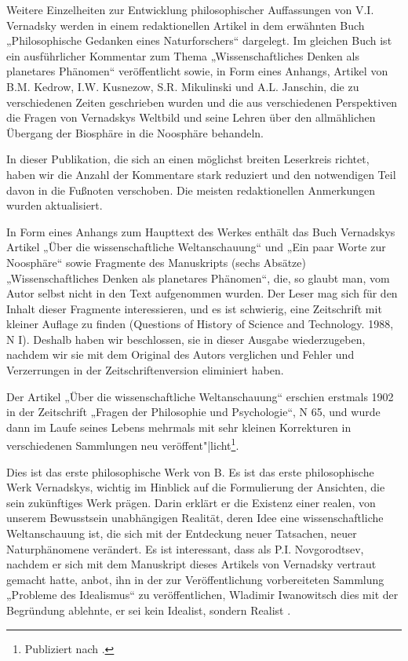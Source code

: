 \documentclass[11pt,a4paper]{article}
\begin{document}
Weitere Einzelheiten zur Entwicklung philosophischer Auffassungen von
V.I. Vernadsky werden in einem redaktionellen Artikel in dem erwähnten Buch
„Philosophische Gedanken eines Naturforschers“ dargelegt. Im gleichen Buch ist
ein ausführlicher Kommentar zum Thema „Wissenschaftliches Denken als
planetares Phänomen“ veröffentlicht sowie, in Form eines Anhangs, Artikel von
B.M. Kedrow, I.W. Kusnezow, S.R. Mikulinski und A.L. Janschin, die zu
verschiedenen Zeiten geschrieben wurden und die aus verschiedenen Perspektiven
die Fragen von Vernadskys Weltbild und seine Lehren über den allmählichen
Übergang der Biosphäre in die Noosphäre behandeln.

In dieser Publikation, die sich an einen möglichst breiten Leserkreis richtet,
haben wir die Anzahl der Kommentare stark reduziert und den notwendigen Teil
davon in die Fußnoten verschoben. Die meisten redaktionellen Anmerkungen
wurden aktualisiert.

In Form eines Anhangs zum Haupttext des Werkes enthält das Buch Vernadskys
Artikel „Über die wissenschaftliche Weltanschauung“ und „Ein paar Worte zur
Noosphäre“ sowie Fragmente des Manuskripts (sechs Absätze) „Wissenschaftliches
Denken als planetares Phänomen“, die, so glaubt man, vom Autor selbst nicht in
den Text aufgenommen wurden. Der Leser mag sich für den Inhalt dieser
Fragmente interessieren, und es ist schwierig, eine Zeitschrift mit kleiner
Auflage zu finden (Questions of History of Science and Technology. 1988, N I).
Deshalb haben wir beschlossen, sie in dieser Ausgabe wiederzugeben, nachdem
wir sie mit dem Original des Autors verglichen und Fehler und Verzerrungen in
der Zeitschriftenversion eliminiert haben.

Der Artikel „Über die wissenschaftliche Weltanschauung“ erschien erstmals 1902
in der Zeitschrift „Fragen der Philosophie und Psychologie“, N 65, und wurde
dann im Laufe seines Lebens mehrmals mit sehr kleinen Korrekturen in
verschiedenen Sammlungen neu veröffent"|licht\footnote{Publiziert nach
  \cite[S. 42-80]{Vernadsky1988}.}. 

Dies ist das erste philosophische Werk von B. Es ist das erste philosophische
Werk Vernadskys, wichtig im Hinblick auf die Formulierung der Ansichten, die
sein zukünftiges Werk prägen. Darin erklärt er die Existenz einer realen, von
unserem Bewusstsein unabhängigen Realität, deren Idee eine wissenschaftliche
Weltanschauung ist, die sich mit der Entdeckung neuer Tatsachen, neuer
Naturphänomene verändert. Es ist interessant, dass als P.I. Novgorodtsev,
nachdem er sich mit dem Manuskript dieses Artikels von Vernadsky vertraut
gemacht hatte, anbot, ihn in der zur Veröffentlichung vorbereiteten Sammlung
„Probleme des Idealismus“ zu veröffentlichen, Wladimir Iwanowitsch dies mit
der Begründung ablehnte, er sei kein Idealist, sondern Realist
\cite{Mochalov1982}.
\end{document}
